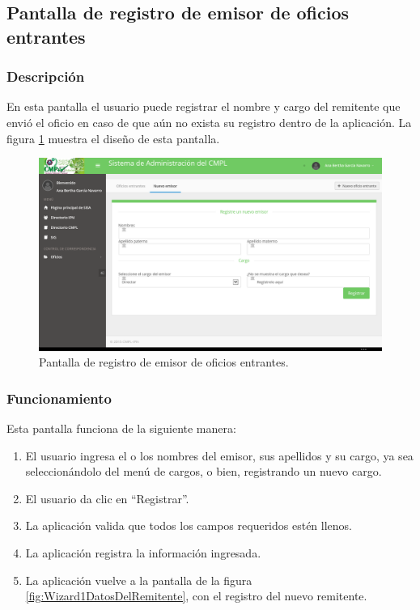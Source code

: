 \subsection{Pantalla de registro de emisor de oficios entrantes}
\subsubsection{Descripción}
	En esta pantalla el usuario puede registrar el nombre y cargo del remitente que envió el oficio en caso de que aún no exista su registro dentro de la aplicación. La figura \ref{fig:NuevoEmisor} muestra el diseño de esta pantalla.		
		
	\begin{figure}[htbp!]
		\centering
			\includegraphics[width=1\textwidth]{Pantallas/NuevoEmisor.png}
		\caption{Pantalla de registro de emisor de oficios entrantes.}
		\label{fig:NuevoEmisor}
	\end{figure}

\subsubsection{Funcionamiento}
	Esta pantalla funciona de la siguiente manera:
	
	\begin{enumerate}
		\item El usuario ingresa el o los nombres del emisor, sus apellidos y su cargo, ya sea seleccionándolo del menú de cargos, o bien, registrando un nuevo cargo.
		\item El usuario da clic en ``Registrar''.
		\item La aplicación valida que todos los campos requeridos estén llenos.
		\item La aplicación registra la información ingresada.
		\item La aplicación vuelve a la pantalla de la figura \ref{fig:Wizard1DatosDelRemitente}, con el registro del nuevo remitente.
	\end{enumerate}

